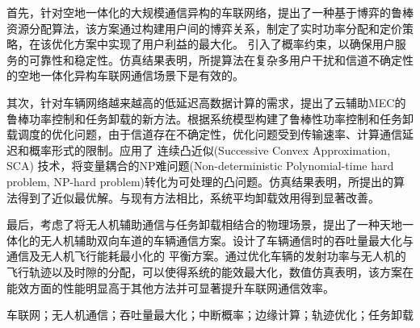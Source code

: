 首先，针对空地一体化的大规模通信异构的车联网络，提出了一种基于博弈的鲁棒资源分配算法，该方案通过构建用户间的博弈关系，制定了实时功率分配和定价策略，在该优化方案中实现了用户利益的最大化。
引入了概率约束，以确保用户服务的可靠性和稳定性。仿真结果表明，所提算法在复杂多用户干扰和信道不确定性的空地一体化异构车联网通信场景下是有效的。

其次，针对车辆网络越来越高的低延迟高数据计算的需求，提出了云辅助MEC的鲁棒功率控制和任务卸载的新方法。根据系统模型构建了鲁棒性功率控制和任务卸载调度的优化问题，由于信道存在不确定性，优化问题受到传输速率、计算通信延迟和概率形式的限制。应用了 连续凸近似(Successive Convex Approximation, SCA) 技术，将变量耦合的NP难问题(Non-deterministic Polynomial-time hard problem, NP-hard problem)转化为可处理的凸问题。仿真结果表明，所提出的算法得到了近似最优解。与现有方法相比，系统平均卸载效用得到显著改善。

最后，考虑了将无人机辅助通信与任务卸载相结合的物理场景，提出了一种天地一体化的无人机辅助双向车道的车辆通信方案。设计了车辆通信时的吞吐量最大化与通信及无人机飞行能耗最小化的
平衡方案。通过优化车辆的发射功率与无人机的飞行轨迹以及时隙的分配，可以使得系统的能效最大化，数值仿真表明，该方案在能效方面的性能明显高于其他方法并可显著提升车联网通信效率。

\begin{keywords}
车联网；无人机通信；吞吐量最大化；中断概率；边缘计算；轨迹优化；任务卸载
\end{keywords}

\makeatletter
{}  \CAST@value@classification   %
\makeatother

\newpage\ \vspace{-2.5em}
\vspace{0.23cm}   %
\begin{center}
\makeatletter
{}\textbf{\CAST@value@entitle}    %
\makeatother
\end{center}

